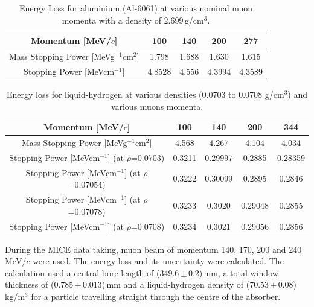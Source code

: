 \begin{table}[htb!]
  \caption{
    Energy Loss for aluminium (Al-6061) at various nominal muon momenta with a density of 2.699\,g/cm$^{3}$.
  }
  \label{tab:Aluminium}
  \begin{center}
    \begin{tabular}{c|c|c|c|c}
    
Momentum [MeV/$c$] & 100 & 140 & 200 & 277     \rule{0pt}{14pt} \\
\hline
{Mass Stopping Power [MeVg${}^{-1}$cm${}^{2}$] } & 1.798 & 1.688 & 1.630 & 1.615
\\
{Stopping Power [MeVcm${}^{-1}$] } & 4.8528 & 4.556 & 4.3994 & 4.3589
\\

    \end{tabular}
  \end{center}
\end{table} 

\begin{table}
  \caption{
    Energy loss for liquid-hydrogen at various densities (0.0703 to 0.0708 g/cm${}^{3}$) and various muons momenta.}
  \label{tab:Hydrogen}
  \begin{center}
    \begin{tabular}{c|c|c|c|c}
Momentum [MeV/$c$] & 100 & 140 & 200 & 344     \rule{0pt}{14pt} \\
\hline
{Mass Stopping Power [MeVg${}^{-1}$cm${}^{2}$] } & 4.568 & 4.267 & 4.104 & 4.034 \\
{Stopping Power [MeVcm${}^{-1}$] }(at $\rho$=0.0703)\textbf{} & 0.3211 & 0.29997 & 0.2885 & 0.28359\\
{Stopping Power [MeVcm${}^{-1}$] }(at $\rho$=0.07054)\textbf{} & 0.3222 & 0.30099 & 0.2895 & 0.2846 \\
{Stopping Power [MeVcm${}^{-1}$] }(at $\rho$=0.07078)\textbf{} & 0.3233 & 0.3020 & 0.29048 & 0.2855 \\
{Stopping Power [MeVcm${}^{-1}$] }(at $\rho$=0.0708)\textbf{} & 0.3234 & 0.3021 & 0.29056 & 0.2856 \\
    \end{tabular}
  \end{center}
\end{table} 


During the MICE data taking, muon beam of momentum 140, 170, 200 and 240\,MeV/$c$ were used. The energy loss and its uncertainty were calculated. The calculation used a central bore length of (349.6\,$\mathrm{\pm}$\,0.2)\,mm, a total window thickness of (0.785\,$\mathrm{\pm}$\,0.013)\,mm and a liquid-hydrogen density of (70.53\,$\mathrm{\pm}$\,0.08)\,kg/m$^{3}$ for a particle travelling straight through the centre of the absorber.

